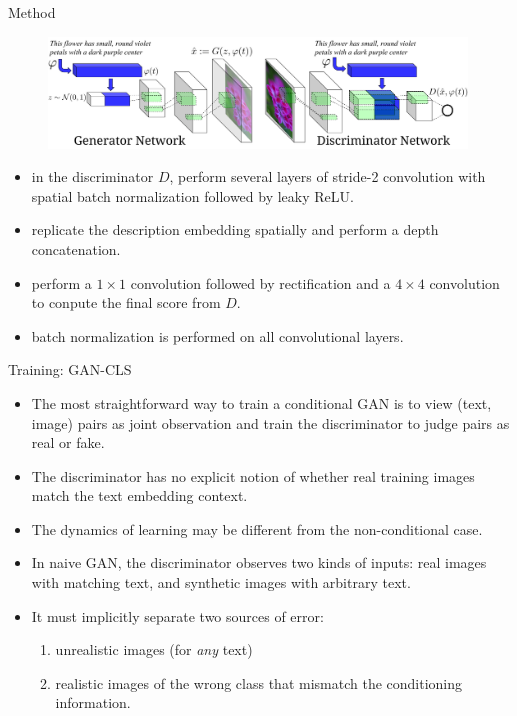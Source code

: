 \documentclass[10pt]{beamer}
\begin{document}
	\begin{frame}[t]{Method}
		\begin{figure}
			\includegraphics[width=30em]{figures/image-synthesis-structure.png}
		\end{figure}
		\begin{itemize}
			\item in the discriminator $D$, perform several layers of stride-2 convolution with spatial batch normalization followed by leaky ReLU.
			\pause
			\item replicate the description embedding spatially and perform a depth concatenation.
			\pause
			\item perform a $1\times1$ convolution followed by rectification and a $4\times4$ convolution to conpute the final score from $D$.
			\pause
			\item batch normalization is performed on all convolutional layers.
		\end{itemize}
	\end{frame}
	
	\begin{frame}{Training: GAN-CLS}
		\begin{itemize}
			\pause
			\item The most straightforward way to train a conditional GAN is to view (text, image) pairs as joint observation and train the discriminator to judge pairs as real or fake.
			\pause
			\item The discriminator has no explicit notion of whether real training images match the text embedding context.
			\pause
			\item The dynamics of learning may be different from the non-conditional case.
			\pause
			\item In naive GAN, the discriminator observes two kinds of inputs: real images with matching text, and synthetic images with arbitrary text.
			\pause
			\item It must implicitly separate two sources of error:
			\begin{enumerate}
				\pause
				\item unrealistic images (for \emph{any} text)
				\pause
				\item realistic images of the wrong class that mismatch the conditioning information.
			\end{enumerate}
		\end{itemize} 
	\end{frame}
\end{document}
